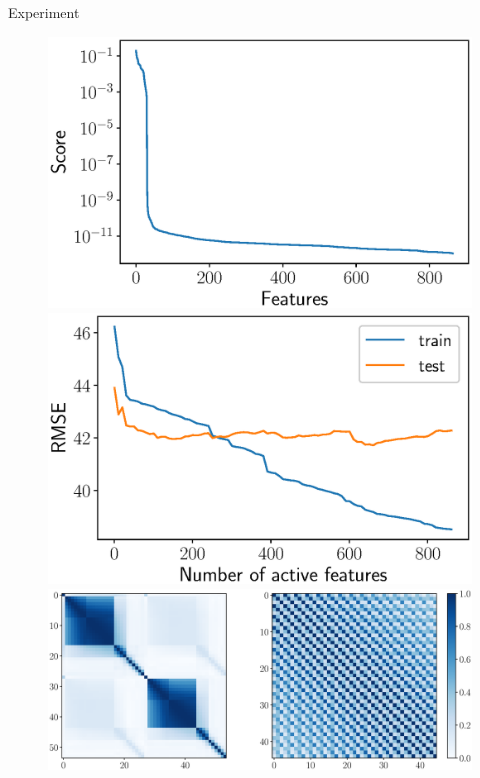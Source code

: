 \documentclass[9pt]{beamer}
\begin{document}
\begin{frame}{Experiment}
	\begin{figure}
		\begin{minipage}{.5\linewidth}
			\includegraphics[width=\linewidth]{figs/feature_scores_ex.eps}
		\end{minipage}%
		\begin{minipage}{.5\linewidth}
			\includegraphics[width=\linewidth]{figs/train_test_qpfs.eps}
		\end{minipage}
		\centering
		\includegraphics[width=0.9\linewidth]{figs/corr_matrix.eps}
	\end{figure}
\end{frame}
\end{document}

